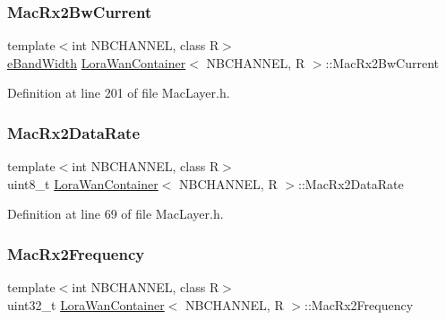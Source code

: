 \subsubsection{\texorpdfstring{Mac\+Rx2\+Bw\+Current}{MacRx2BwCurrent}}
{\footnotesize\ttfamily template$<$int N\+B\+C\+H\+A\+N\+N\+EL, class R$>$ \\
\mbox{\hyperlink{_define_8h_a6cbb491180e131f374cdbe63880c85e1}{e\+Band\+Width}} \mbox{\hyperlink{class_lora_wan_container}{Lora\+Wan\+Container}}$<$ N\+B\+C\+H\+A\+N\+N\+EL, R $>$\+::Mac\+Rx2\+Bw\+Current\hspace{0.3cm}{\ttfamily [protected]}}



Definition at line 201 of file Mac\+Layer.\+h.

\mbox{\label{class_lora_wan_container_aca87f947d0988768d234f64be6ad55b7}} 
\subsubsection{\texorpdfstring{Mac\+Rx2\+Data\+Rate}{MacRx2DataRate}}
{\footnotesize\ttfamily template$<$int N\+B\+C\+H\+A\+N\+N\+EL, class R$>$ \\
uint8\+\_\+t \mbox{\hyperlink{class_lora_wan_container}{Lora\+Wan\+Container}}$<$ N\+B\+C\+H\+A\+N\+N\+EL, R $>$\+::Mac\+Rx2\+Data\+Rate}



Definition at line 69 of file Mac\+Layer.\+h.

\mbox{\label{class_lora_wan_container_af4018ef9a538f389d20f9c720fcf8ce1}} 
\subsubsection{\texorpdfstring{Mac\+Rx2\+Frequency}{MacRx2Frequency}}
{\footnotesize\ttfamily template$<$int N\+B\+C\+H\+A\+N\+N\+EL, class R$>$ \\
uint32\+\_\+t \mbox{\hyperlink{class_lora_wan_container}{Lora\+Wan\+Container}}$<$ N\+B\+C\+H\+A\+N\+N\+EL, R $>$\+::Mac\+Rx2\+Frequency}




